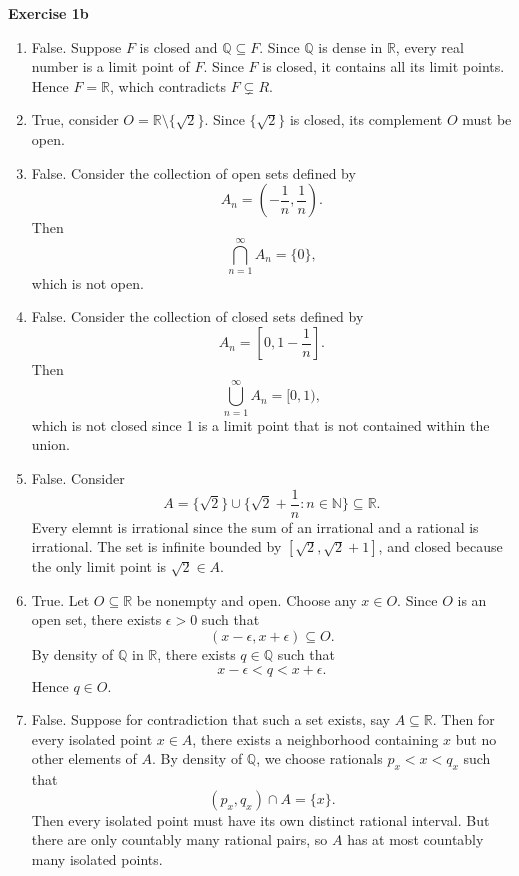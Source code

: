 \documentclass[12pt]{article}
\begin{document}
\textbf{Exercise 1b}
\begin{enumerate}[label=(\roman*)]
    \item False. Suppose \( F \) is closed and \( \mathbb{Q} \subseteq F \). Since \( \mathbb{Q} \) is dense in \( \mathbb{R} \), every real number is a limit point of \( F \).  Since \( F \) is closed, it contains all its limit points. Hence \( F = \mathbb{R} \), which contradicts \( F \subsetneq R \).
    \item True, consider \( O = \mathbb{R} \setminus \{\sqrt{2}\} \). Since \( \{\sqrt{2}\} \) is closed, its complement \( O \) must be open.
    \item False. Consider the collection of open sets defined by
          \[
              A_n = (-\frac{1}{n}, \frac{1}{n}).
          \]
          Then
          \[
              \bigcap_{n=1}^{\infty} A_n = \{0\},
          \]
          which is not open.

    \item False. Consider the collection of closed sets defined by
          \[
              A_n = [0, 1 - \frac{1}{n}].
          \]
          Then
          \[
              \bigcup_{n=1}^{\infty} A_n = [0, 1),
          \]
          which is not closed since 1 is a limit point that is not contained within the union.

    \item False. Consider
          \[
              A = \{\sqrt{2}\} \cup \{\sqrt{2} + \frac{1}{n} : n \in \mathbb{N}\} \subseteq \mathbb{R}.
          \]
          Every elemnt is irrational since the sum of an irrational and a rational is irrational. The set is infinite bounded by \( [\sqrt{2}, \sqrt{2} + 1] \), and closed because the only limit point is \( \sqrt{2} \in A \).


    \item True. Let \( O \subseteq \mathbb{R} \) be nonempty and open. Choose any \( x \in O \). Since \( O \) is an open set, there exists \( \epsilon > 0 \) such that
          \[
              (x- \epsilon, x + \epsilon ) \subseteq O.
          \]
          By density of \( \mathbb{Q} \) in \( \mathbb{R} \), there exists \( q \in \mathbb{Q} \) such that
          \[
              x - \epsilon < q < x + \epsilon.
          \]
          Hence \( q \in O \).

    \item False. Suppose for contradiction that such a set exists, say \( A \subseteq \mathbb{R} \). Then for every isolated point \( x \in A \), there exists a neighborhood containing \( x \) but no other elements of \( A \). By density of \( \mathbb{Q} \), we choose rationals \( p_x < x < q_x \) such that
          \[
              (p_x, q_x) \cap A = \{x\}.
          \]
          Then every isolated point must have its own distinct rational interval. But there are only countably many rational pairs, so \( A \) has at most countably many isolated points.



\end{enumerate}
\end{document}
